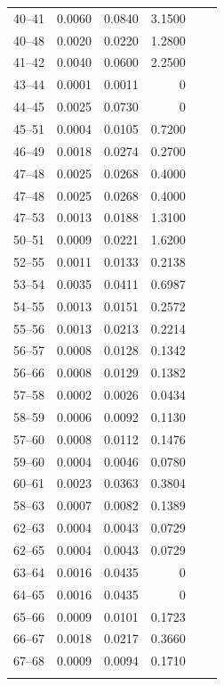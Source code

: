 \documentclass[tombow,dvipdfmx]{corona-a5-1.1}
\begin{document}
\begin{table}[h]
{\begin{minipage}{0.49\linewidth}
\begin{tabular}{crrrcc}
40--41  & 0.0060 & 0.0840 & 3.1500 \\
40--48  & 0.0020 & 0.0220 & 1.2800 \\
41--42  & 0.0040 & 0.0600 & 2.2500 \\
43--44  & 0.0001 & 0.0011 & 0 \\
44--45  & 0.0025 & 0.0730 & 0 \\
45--51  & 0.0004 & 0.0105 & 0.7200 \\
46--49  & 0.0018 & 0.0274 & 0.2700 \\
47--48  & 0.0025 & 0.0268 & 0.4000 \\
47--48  & 0.0025 & 0.0268 & 0.4000 \\
47--53  & 0.0013 & 0.0188 & 1.3100 \\
50--51  & 0.0009 & 0.0221 & 1.6200 \\
52--55  & 0.0011 & 0.0133 & 0.2138 \\
53--54  & 0.0035 & 0.0411 & 0.6987 \\
54--55  & 0.0013 & 0.0151 & 0.2572 \\
55--56  & 0.0013 & 0.0213 & 0.2214 \\
56--57  & 0.0008 & 0.0128 & 0.1342 \\
56--66  & 0.0008 & 0.0129 & 0.1382 \\
57--58  & 0.0002 & 0.0026 & 0.0434 \\
58--59  & 0.0006 & 0.0092 & 0.1130 \\
57--60  & 0.0008 & 0.0112 & 0.1476 \\
59--60  & 0.0004 & 0.0046 & 0.0780 \\
60--61  & 0.0023 & 0.0363 & 0.3804 \\
58--63  & 0.0007 & 0.0082 & 0.1389 \\
62--63  & 0.0004 & 0.0043 & 0.0729 \\
62--65  & 0.0004 & 0.0043 & 0.0729 \\
63--64  & 0.0016 & 0.0435 & 0 \\
64--65  & 0.0016 & 0.0435 & 0 \\
65--66  & 0.0009 & 0.0101 & 0.1723 \\
66--67  & 0.0018 & 0.0217 & 0.3660 \\
67--68  & 0.0009 & 0.0094 & 0.1710 \\
\\
   \hline
  \end{tabular}
  \end{minipage}
  }
\end{table}
\end{document}
